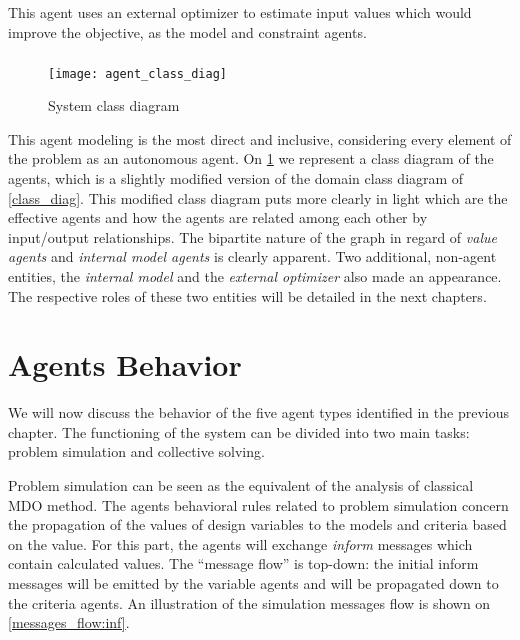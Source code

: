 This agent uses an external optimizer to estimate input values which would improve the objective, as the model and constraint agents.

\paragraph*{}

\begin{figure}
\texttt{[image: agent\_class\_diag]}
\caption{System class diagram}\label{SMA_class_diagram}
\end{figure}

This agent modeling is the most direct and inclusive, considering every element of the problem as an autonomous agent. On \figurename{} \ref{SMA_class_diagram} we represent a class diagram of the agents, which is a slightly modified version of the domain class diagram of \figurename{} \ref{class_diag}. This modified class diagram puts more clearly in light which are the effective agents and how the agents are related among each other by input/output relationships. The bipartite nature of the graph in regard of \emph{value agents} and \emph{internal model agents} is clearly apparent. Two additional, non-agent entities, the \emph{internal model} and the \emph{external optimizer} also made an appearance. The respective roles of these two entities will be detailed in the next chapters.

\chapter{Agents Behavior}\label{agent_behav_chap}

We will now discuss the behavior of the five agent types identified in the previous chapter. The functioning of the system can be divided into two main tasks: problem simulation and collective solving.

Problem simulation can be seen as the equivalent of the analysis of classical MDO method. The agents behavioral rules related to problem simulation concern the propagation of the values of design variables to the models and criteria based on the value. For this part, the agents will exchange \emph{inform} messages which contain calculated values. The \enquote{message flow} is top-down: the initial inform messages will be emitted by the variable agents and will be propagated down to the criteria agents. An illustration of the simulation messages flow is shown on \figurename{} \ref{messages_flow:inf}.

